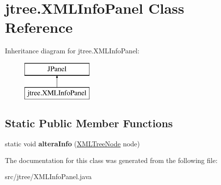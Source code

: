 \hypertarget{classjtree_1_1_x_m_l_info_panel}{\section{jtree.\+X\+M\+L\+Info\+Panel Class Reference}
\label{classjtree_1_1_x_m_l_info_panel}
}
Inheritance diagram for jtree.\+X\+M\+L\+Info\+Panel\+:\begin{figure}[H]
\begin{center}
\leavevmode
\includegraphics[height=2.000000cm]{classjtree_1_1_x_m_l_info_panel}
\end{center}
\end{figure}
\subsection*{Static Public Member Functions}
\begin{DoxyCompactItemize}
\item 
\hypertarget{classjtree_1_1_x_m_l_info_panel_aa6c86f94d049f3fe3e4a5cc45c22a257}{static void {\bfseries altera\+Info} (\hyperlink{classjtree_1_1_x_m_l_tree_node}{X\+M\+L\+Tree\+Node} node)}\label{classjtree_1_1_x_m_l_info_panel_aa6c86f94d049f3fe3e4a5cc45c22a257}

\end{DoxyCompactItemize}


The documentation for this class was generated from the following file\+:\begin{DoxyCompactItemize}
\item 
src/jtree/X\+M\+L\+Info\+Panel.\+java\end{DoxyCompactItemize}
